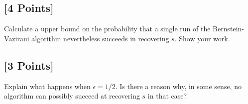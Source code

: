\documentclass[11pt]{article}
\begin{document}
\subsection{[4 Points]} Calculate a upper bound on the
probability that a single run of
the Bernstein-Vazirani algorithm nevertheless succeeds in recovering
$s$. Show your work.
\subsection{[3 Points]} Explain what happens when $\epsilon=1/2$. Is there a
reason why, in some
sense, no algorithm can possibly succeed at
recovering $s$ in that case?
\end{document}
